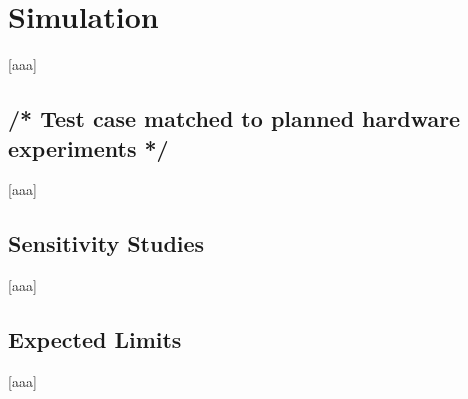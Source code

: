 \chapter{Simulation} \label{sec:Simulation}
    [aaa]

\section{/* Test case matched to planned hardware experiments */} \label{sec:/* Test case matched to planned hardware experiments */}
    [aaa]

\section{Sensitivity Studies} \label{sec:Sensitivity Studies}
    [aaa]

\section{Expected Limits} \label{sec:Expected Limits}
    [aaa]
